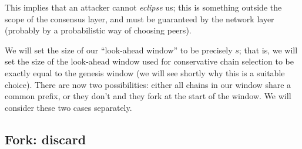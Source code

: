 This implies that an attacker cannot \emph{eclipse} us; this is something
outside the scope of the consensus layer, and must be guaranteed by the network
layer (probably by a probabilistic way of choosing peers).

We will set the size of our ``look-ahead window'' to be precisely $s$; that is,
we will set the size of the look-ahead window used for conservative chain
selection to be exactly equal to the genesis window (we will see shortly why
this is a suitable choice). There are now two possibilities: either all chains
in our window share a common prefix, or they don't and they fork at the start of
the window. We will consider these two cases separately.

\pagebreak

\subsection{Fork: discard}
\label{genesis:discard}

